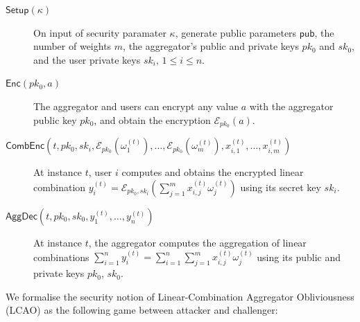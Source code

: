\documentclass[twocolumn]{autart}
\begin{document}
\begin{description}
    \item[$\mathsf{Setup}(\kappa)$] On input of security paramater $\kappa$, generate public parameters $\mathsf{pub}$, the number of weights $m$, the aggregator's public and private keys $pk_0$ and $sk_0$, and the user private keys $sk_i,\,1\leq i \leq n$.
    \item[$\mathsf{Enc}(pk_0, a)$] The aggregator and users can encrypt any value $a$ with the aggregator public key $pk_0$, and obtain the encryption $\mathcal{E}_{pk_0}(a)$.
    \item[$\mathsf{CombEnc}(t, pk_0, sk_i, \mathcal{E}_{pk_0}(\omega_1^{(t)}),\dots,\mathcal{E}_{pk_0}(\omega_m^{(t)}), x^{(t)}_{i,1},\dots,x^{(t)}_{i,m})$] At instance $t$, user $i$ computes and obtains the encrypted linear combination $y^{(t)}_i = \mathcal{E}_{pk_0,sk_i}(\sum^m_{j=1}x^{(t)}_{i,j}\omega^{(t)}_j)$ using its secret key $sk_i$.
    \item[$\mathsf{AggDec}(t, pk_0, sk_0, y^{(t)}_1,\dots,y^{(t)}_n)$] At instance $t$, the aggregator computes the aggregation of linear combinations $\sum^{n}_{i=1}y_i^{(t)}=\sum^{n}_{i=1}\sum^{m}_{j=1} x^{(t)}_{i,j}\omega^{(t)}_j$ using its public and private keys $pk_0$, $sk_0$.
\end{description}

We formalise the security notion of Linear-Combination Aggregator Obliviousness (LCAO) as the following game between attacker and challenger:
\end{document}
